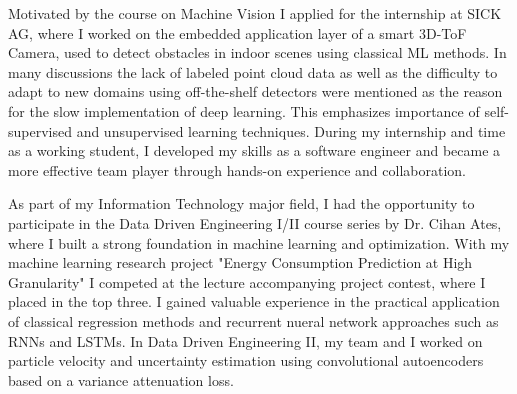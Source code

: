     Motivated by the course on Machine Vision I applied for the internship at SICK AG, where I worked on the embedded application layer of a smart 3D-ToF Camera, used to detect obstacles in indoor scenes using classical ML methods. In many discussions the lack of labeled point cloud data as well as the difficulty to adapt to new domains using off-the-shelf detectors were mentioned as the reason for the slow implementation of deep learning. This emphasizes importance of self-supervised and unsupervised learning techniques. During my internship and time as a working student, I developed my skills as a software engineer and became a more effective team player through hands-on experience and collaboration.

    As part of my Information Technology major field, I had the opportunity to participate in the Data Driven Engineering I/II course series by Dr. Cihan Ates, where I built a strong foundation in machine learning and optimization. With my machine learning research project "Energy Consumption Prediction at High Granularity" I competed at the lecture accompanying project contest, where I placed in the top three. I gained valuable experience in the practical application of classical regression methods and recurrent nueral network approaches such as RNNs and LSTMs. In Data Driven Engineering II, my team and I worked on particle velocity and uncertainty estimation using convolutional autoencoders based on a variance attenuation loss. 



